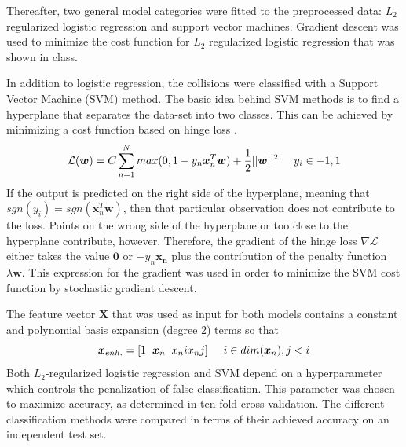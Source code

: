 \documentclass[10pt,conference,compsocconf]{IEEEtran}
\begin{document}
\par
Thereafter, two general model categories were fitted to the preprocessed data: $L_2$ regularized logistic regression and support vector machines. Gradient descent was used to minimize the cost function for $L_2$ regularized logistic regression that was shown in class.
\par
In addition to logistic regression, the collisions were classified with a Support Vector Machine (SVM) method. The basic idea behind SVM methods is to find a hyperplane that separates the data-set into two classes. This can be achieved by minimizing a cost function based on hinge loss \cite{SVM_ref}.
\begin{equation}
\mathcal{L}(\boldsymbol{w}) = C \sum_{n=1}^N max(0,1-y_n \boldsymbol{x}_n^T\boldsymbol{w}) + \frac{1}{2}||\boldsymbol{w}||^2 \hspace{5mm} y_i \in {-1,1}
\end{equation}  
If the output is predicted on the right side of the hyperplane, meaning that $sgn(y_i) = sgn(\boldsymbol{x}_n^T\boldsymbol{w})$, then that particular observation does not contribute to the loss. Points on the wrong side of the hyperplane or too close to the hyperplane contribute, however. Therefore, the gradient of the hinge loss $\nabla \mathcal{L}$ either takes the value $\boldsymbol{0}$ or $-y_n\boldsymbol{x_n}$ plus the contribution of the penalty function $\lambda \boldsymbol{w}$. This expression for the gradient was used in order to minimize the SVM cost function by stochastic gradient descent.
\par
The feature vector $\boldsymbol{X}$ that was used as input for both models contains a constant and polynomial basis expansion (degree 2) terms so that
\begin{equation}
\boldsymbol{x}_{enh.} = [1 \hspace{2mm} \boldsymbol{x}_n \hspace{2mm} x_ni x_nj] \hspace{5mm} i \in dim(\boldsymbol{x}_n), j < i
\end{equation}
Both $L_2$-regularized logistic regression and SVM depend on a hyperparameter which controls the penalization of false classification. This parameter was chosen to maximize accuracy, as determined in ten-fold cross-validation. The different classification methods were compared in terms of their achieved accuracy on an independent test set. 
\end{document}
